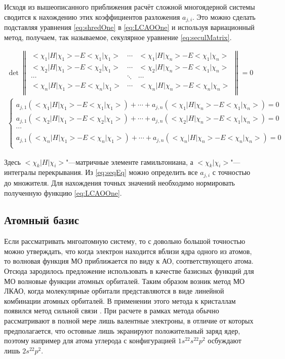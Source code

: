 Исходя из вышеописанного приближения расчёт сложной многоядерной системы сводится к нахождению этих коэффициентов разложения $a_{j,i}$. 
Это можно сделать подставляя уравнения \ref{eq:shredOne} в \ref{eq:LCAOOne} и используя вариационный метод, получаем, так называемое, секулярное уравнение \ref{eq:seculMatrix}.

\begin{eqnarray}
\label{eq:seculMatrix}
\det 
\begin{Vmatrix}
<\chi_1|H|\chi_1>-E<\chi_1|\chi_1> & \cdots & <\chi_1|H|\chi_n>-E<\chi_1|\chi_n> \\
<\chi_2|H|\chi_1>-E<\chi_2|\chi_1> & \cdots & <\chi_2|H|\chi_n>-E<\chi_1|\chi_n> \\
\cdots &  \ddots & \cdots \\
<\chi_n|H|\chi_1>-E<\chi_n|\chi_1> & \cdots & <\chi_n|H|\chi_n>-E<\chi_n|\chi_n> \\
\end{Vmatrix}=0\\
\label{eq:seqEq}
\left\{\begin{matrix}
a_{j,1}(<\chi_1|H|\chi_1>-E<\chi_1|\chi_1>) + \cdots + a_{j,n}(<\chi_1|H|\chi_n>-E<\chi_1|\chi_n>)=0 \\
a_{j,1}(<\chi_2|H|\chi_1>-E<\chi_2|\chi_1>) + \cdots + a_{j,n}(<\chi_2|H|\chi_n>-E<\chi_1|\chi_n>)=0 \\
\cdots  \\
a_{j,1}(<\chi_n|H|\chi_1>-E<\chi_n|\chi_1>) + \cdots + a_{j,n}(<\chi_n|H|\chi_n>-E<\chi_n|\chi_n>)=0 \\
\end{matrix}\right.
\end{eqnarray}

Здесь $<\chi_k|H|\chi_i>$"---матричные элементе гамильтониана, а $<\chi_k|\chi_i>$"---интегралы перекрывания. 
Из \ref{eq:seqEq} можно определить все $a_{j,i}$ с точностью до множителя. 
Для нахождения точных значений необходимо нормировать полученную функцию \ref{eq:LCAOOne}.

\subsection{Атомный базис}

Если рассматривать мнгоатомную систему, то с довольно большой точностью можно утверждать, что когда электрон находится вблизи ядра одного из атомов, то волновая функция МО приближается по виду к АО, соответствующего атома. 
Отсюда зародилось предложение использовать в качестве базисных функций для МО волновые функции атомных орбиталей. 
Таким образом возник метод МО ЛКАО, когда молекулярные орбитали представляются в виде линейной комбинации атомных орбиталей. 
В применении этого метода к кристаллам появился метод сильной связи \cite{sleiter1978,sleiter1969,zaiman1974,levin1974}. 
При расчете в рамках метода обычно рассматривают в полной мере лишь  валентные электроны, в отличие от которых предполагается, что остовные лишь экранируют положительный заряд ядер, поэтому например для атома углерода с конфигурацией $1s^22s^22p^2$ осбуждают лишь $2s^22p^2$.

